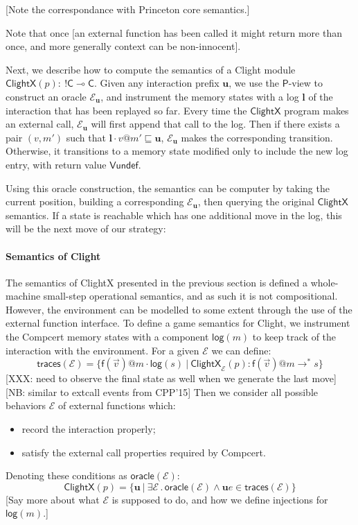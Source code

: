 \documentclass[acmsmall,anonymous]{acmart}
\makeatletter
\newcommand{\kw}[1]{\ensuremath{ \textsf{#1} }}
\newcommand{\EC}{\kw{C}}
\newcommand{\mcall}[3]{\kw{#1}({#2})@{#3}}
\newcommand{\mret}[2]{{#1}@{#2}}
\makeatother
\begin{document}
[Note the correspondance with Princeton core semantics.]

Note that once [an external function has been called
it might return more than once,
and more generally context can be non-innocent].

Next, we describe how to compute
the semantics of a Clight module
$\kw{ClightX}(p) : \: !\EC \multimap \EC$.
Given any interaction prefix $\mathbf{u}$,
we use the $\kw{P}$-view to construct an oracle $\mathcal{E}_\mathbf{u}$,
and instrument the memory states with a log $\mathbf{l}$
of the interaction that has been replayed so far.
Every time the \kw{ClightX} program
makes an external call,
$\mathcal{E}_\mathbf{u}$
will first append that call to the log.
Then if there exists a pair $(v, m')$
such that $\mathbf{l} \cdot \mret{v}{m'} \sqsubseteq \mathbf{u}$,
$\mathcal{E}_\mathbf{u}$ makes the corresponding transition.
Otherwise,
it transitions to a memory state
modified only to include the new log entry,
with return value $\kw{Vundef}$.

Using this oracle construction,
the semantics can be computer by taking the current position,
building a corresponding $\mathcal{E}_\mathbf{u}$,
then querying the original $\kw{ClightX}$ semantics.
If a state is reachable which has one additional move in the log,
this will be the next move of our strategy:

\paragraph{Semantics of Clight}

The semantics of ClightX
presented in the previous section
is defined a whole-machine small-step operational semantics,
and as such it is not compositional.
However,
the environment can be modelled to some extent
through the use of the external function interface.
To define a game semantics for Clight,
we instrument the Compcert memory states
with a component $\kw{log}(m)$
to keep track of the interaction with the environment.
For a given $\mathcal{E}$ we can define:
\[
  \kw{traces}(\mathcal{E}) = \{
    \mcall{f}{\vec{v}}{m} \cdot \kw{log}(s) \ \vert\ 
    \kw{ClightX}_\mathcal{E}(p) :
      \mcall{f}{\vec{v}}{m} \rightarrow^* s
  \}
\]
[XXX: need to observe the final state as well
when we generate the last move]
[NB: similar to extcall events from CPP'15]
Then we consider
all possible behaviors $\mathcal{E}$ of external functions which:
\begin{itemize}
\item record the interaction properly;
\item satisfy the external call properties required by Compcert.
\end{itemize}
Denoting these conditions as $\kw{oracle}(\mathcal{E})$:
\[
  \kw{ClightX}(p) = \{
    \mathbf{u} \ \vert\ 
    \exists \mathcal{E} \,.\,
      \kw{oracle}(\mathcal{E}) \wedge
      \mathbf{u} e \in \kw{traces}(\mathcal{E})
  \}
\]
[Say more about what $\mathcal{E}$ is supposed to do,
and how we define injections for $\kw{log}(m)$.]
\end{document}

